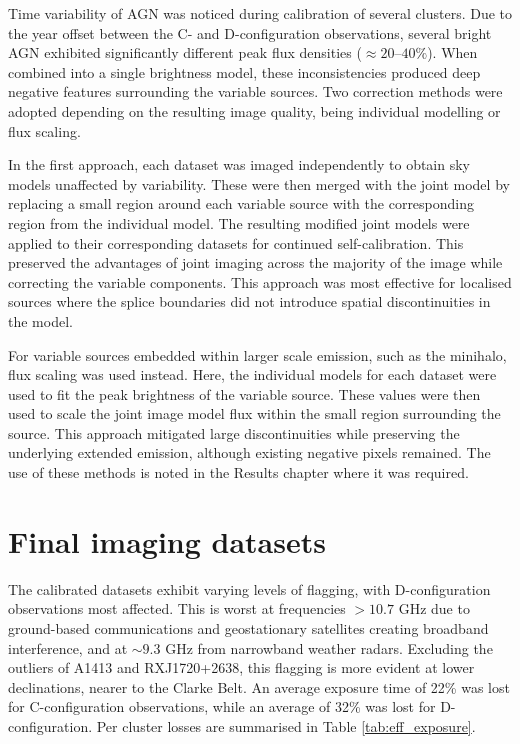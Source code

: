 Time variability of AGN was noticed during calibration of several clusters. Due to the year offset between the C- and D-configuration observations, several bright AGN exhibited significantly different peak flux densities ($\approx\!20$--$40\%$). When combined into a single brightness model, these inconsistencies produced deep negative features surrounding the variable sources. Two correction methods were adopted depending on the resulting image quality, being individual modelling or flux scaling. 

In the first approach, each dataset was imaged independently to obtain sky models unaffected by variability. These were then merged with the joint model by replacing a small region around each variable source with the corresponding region from the individual model. The resulting modified joint models were applied to their corresponding datasets for continued self-calibration. This preserved the advantages of joint imaging across the majority of the image while correcting the variable components. This approach was most effective for localised sources where the splice boundaries did not introduce spatial discontinuities in the model.

For variable sources embedded within larger scale emission, such as the minihalo, flux scaling was used instead. Here, the individual models for each dataset were used to fit the peak brightness of the variable source. These values were then used to scale the joint image model flux within the small region surrounding the source. This approach mitigated large discontinuities while preserving the underlying extended emission, although existing negative pixels remained. The use of these methods is noted in the Results chapter where it was required.

\section{Final imaging datasets} 
\label{sec:final_dataset_summary}

The calibrated datasets exhibit varying levels of flagging, with D-configuration observations most affected. This is worst at frequencies $>10.7$ GHz due to ground-based communications and geostationary satellites creating broadband interference, and at $\sim9.3$ GHz from narrowband weather radars. Excluding the outliers of A1413 and RXJ1720+2638, this flagging is more evident at lower declinations, nearer to the Clarke Belt. An average exposure time of 22\% was lost for C-configuration observations, while an average of 32\% was lost for D-configuration. Per cluster losses are summarised in Table \ref{tab:eff_exposure}. 

